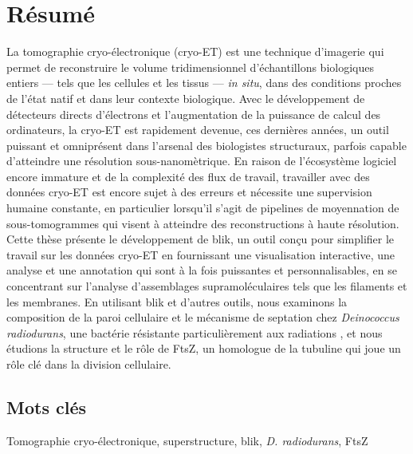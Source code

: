 \section*{Résumé} %
La tomographie cryo-électronique (cryo-ET) est une technique d'imagerie qui permet de reconstruire le volume tridimensionnel d'échantillons biologiques entiers --- tels que les cellules et les tissus --- \textit{in situ}, dans des conditions proches de l'état natif et dans leur contexte biologique.
Avec le développement de détecteurs directs d'électrons et l'augmentation de la puissance de calcul des ordinateurs, la cryo-ET est rapidement devenue, ces dernières années, un outil puissant et omniprésent dans l'arsenal des biologistes structuraux, parfois capable d'atteindre une résolution sous-nanomètrique.
En raison de l'écosystème logiciel encore immature et de la complexité des flux de travail, travailler avec des données cryo-ET est encore sujet à des erreurs et nécessite une supervision humaine constante, en particulier lorsqu'il s'agit de pipelines de moyennation de sous-tomogrammes qui visent à atteindre des reconstructions à haute résolution.
Cette thèse présente le développement de blik, un outil conçu pour simplifier le travail sur les données cryo-ET en fournissant une visualisation interactive, une analyse et une annotation qui sont à la fois puissantes et personnalisables, en se concentrant sur l'analyse d'assemblages supramoléculaires tels que les filaments et les membranes.
En utilisant blik et d'autres outils, nous examinons la composition de la paroi cellulaire et le mécanisme de septation chez \textit{Deinococcus radiodurans}, une bactérie résistante particulièrement aux radiations , et nous étudions la structure et le rôle de FtsZ, un homologue de la tubuline qui joue un rôle clé dans la division cellulaire.

\subsection*{Mots clés}
Tomographie cryo-électronique, superstructure, blik, \textit{D. radiodurans}, FtsZ
